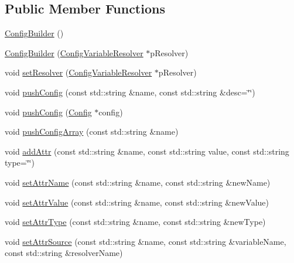 \subsection*{Public Member Functions}
\begin{DoxyCompactItemize}
\item 
\hyperlink{classtheoria_1_1config_1_1ConfigBuilder_a8344379e6c6faa7bab5292abf60bb7ca}{Config\+Builder} ()
\item 
\hyperlink{classtheoria_1_1config_1_1ConfigBuilder_adf10af8634fe6ce1af5627e2c1ae8baa}{Config\+Builder} (\hyperlink{classtheoria_1_1config_1_1ConfigVariableResolver}{Config\+Variable\+Resolver} $\ast$p\+Resolver)
\item 
void \hyperlink{classtheoria_1_1config_1_1ConfigBuilder_aff25e4ada86baf419820b610a4707cbe}{set\+Resolver} (\hyperlink{classtheoria_1_1config_1_1ConfigVariableResolver}{Config\+Variable\+Resolver} $\ast$p\+Resolver)
\item 
void \hyperlink{classtheoria_1_1config_1_1ConfigBuilder_ad7542393581c33259aae6d07d11391dd}{push\+Config} (const std\+::string \&name, const std\+::string \&desc=\char`\"{}\char`\"{})
\item 
void \hyperlink{classtheoria_1_1config_1_1ConfigBuilder_a2dc70e43627e67521bf921152ee3c131}{push\+Config} (\hyperlink{classtheoria_1_1config_1_1Config}{Config} $\ast$config)
\item 
void \hyperlink{classtheoria_1_1config_1_1ConfigBuilder_a38baf2a30a0be4a5e99969c07223bc9b}{push\+Config\+Array} (const std\+::string \&name)
\item 
void \hyperlink{classtheoria_1_1config_1_1ConfigBuilder_ac58bdaa4a914c8ad0c4901128e2e7b6b}{add\+Attr} (const std\+::string \&name, const std\+::string value, const std\+::string type=\char`\"{}\char`\"{})
\item 
void \hyperlink{classtheoria_1_1config_1_1ConfigBuilder_a267121aec4f3c65ff88eb36d691ce509}{set\+Attr\+Name} (const std\+::string \&name, const std\+::string \&new\+Name)
\item 
void \hyperlink{classtheoria_1_1config_1_1ConfigBuilder_adcdd668ab4958497e7328b02ad8f8f83}{set\+Attr\+Value} (const std\+::string \&name, const std\+::string \&new\+Value)
\item 
void \hyperlink{classtheoria_1_1config_1_1ConfigBuilder_a019902280637cd43d9a69acb678a5967}{set\+Attr\+Type} (const std\+::string \&name, const std\+::string \&new\+Type)
\item 
void \hyperlink{classtheoria_1_1config_1_1ConfigBuilder_af30b50a47285d06afae1b74edfb4d762}{set\+Attr\+Source} (const std\+::string \&name, const std\+::string \&variable\+Name, const std\+::string \&resolver\+Name)

\end{DoxyCompactItemize}
